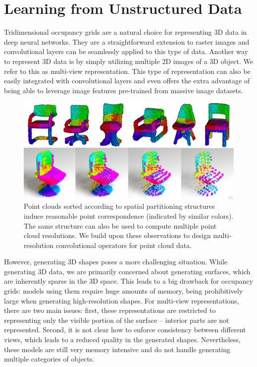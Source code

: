 \section*{Learning from Unstructured Data}

Tridimensional occupancy grids are a natural choice for representing 3D data in deep neural networks.
They are a straightforward extension to raster images and convolutional layers can be seamlessly
applied to this type of data.
Another way to represent 3D data is by simply utilizing multiple 2D images of a 3D object.
We refer to this as multi-view representation.
This type of representation can also be easily integrated with convolutional layers and even
offers the extra advantage of being able to leverage image features pre-trained from massive image
datasets.

\begin{figure}
 \begin{center}
 \includegraphics[width=0.7\linewidth]{figs/shapepartition.png}
 \end{center}
 \vspace{-20pt}
 \caption{\small Point clouds sorted according to spatial partitioning structures induce
 reasonable point correspondence (indicated by similar colors).
 The same structure can also be used to compute multiple point cloud resolutions.
 We build upon these observations to design multi-resolution convolutional operators
 for point cloud data.}
\end{figure}

However, generating 3D shapes poses a more challenging situation.
While generating 3D data, we are primarily concerned about generating surfaces, which are
inherently sparse in the 3D space.
This leads to a big drawback for occupancy grids: models using them require huge amounts of memory,
being prohibitively large when generating high-resolution shapes.
For multi-view representations, there are two main issues:
first, these representations are restricted to representing only the visible portion of the surface --
interior parts are not represented.
Second, it is not clear how to enforce consistency between different views, which leads to a reduced quality in the generated shapes.
Nevertheless, these models are still very memory intensive and do not handle generating
multiple categories of objects.

